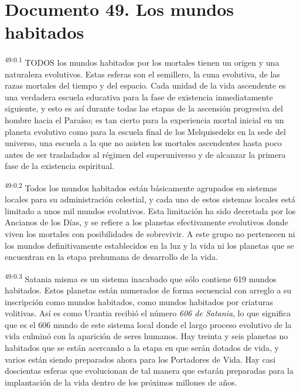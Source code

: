 \chapter{Documento 49. Los mundos habitados}
\par
\textsuperscript{49:0.1} TODOS los mundos habitados por los mortales tienen un origen y una naturaleza evolutivos. Estas esferas son el semillero, la cuna evolutiva, de las razas mortales del tiempo y del espacio. Cada unidad de la vida ascendente es una verdadera escuela educativa para la fase de existencia inmediatamente siguiente, y esto es así durante todas las etapas de la ascensión progresiva del hombre hacia el Paraíso; es tan cierto para la experiencia mortal inicial en un planeta evolutivo como para la escuela final de los Melquisedeks en la sede del universo, una escuela a la que no asisten los mortales ascendentes hasta poco antes de ser trasladados al régimen del superuniverso y de alcanzar la primera fase de la existencia espiritual.

\par
\textsuperscript{49:0.2} Todos los mundos habitados están básicamente agrupados en sistemas locales para su administración celestial, y cada uno de estos sistemas locales está limitado a unos mil mundos evolutivos. Esta limitación ha sido decretada por los Ancianos de los Días, y se refiere a los planetas efectivamente evolutivos donde viven los mortales con posibilidades de sobrevivir. A este grupo no pertenecen ni los mundos definitivamente establecidos en la luz y la vida ni los planetas que se encuentran en la etapa prehumana de desarrollo de la vida.

\par
\textsuperscript{49:0.3} Satania misma es un sistema inacabado que sólo contiene 619 mundos habitados. Estos planetas están numerados de forma secuencial con arreglo a su inscripción como mundos habitados, como mundos habitados por criaturas volitivas. Así es como Urantia recibió el número \textit{606 de Satania}, lo que significa que es el 606{\textordmasculine} mundo de este sistema local donde el largo proceso evolutivo de la vida culminó con la aparición de seres humanos. Hay treinta y seis planetas no habitados que se están acercando a la etapa en que serán dotados de vida, y varios están siendo preparados ahora para los Portadores de Vida. Hay casi doscientas esferas que evolucionan de tal manera que estarán preparadas para la implantación de la vida dentro de los próximos millones de años.

